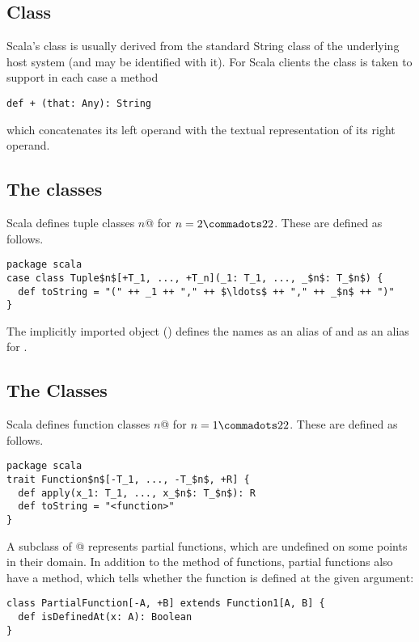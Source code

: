 \subsection{Class \large{}}

Scala's \lstinline@String@ class is usually derived from the standard String
class of the underlying host system (and may be identified with
it). For Scala clients the class is taken to support in each case a
method
\begin{lstlisting}
def + (that: Any): String 
\end{lstlisting}
which concatenates its left operand with the textual representation of its
right operand.

\subsection{The \large{} classes}

Scala defines tuple classes \lstinline@Tuple$n$@ for $n = 2 \commadots 22$.
These are defined as follows.

\begin{lstlisting}
package scala 
case class Tuple$n$[+T_1, ..., +T_n](_1: T_1, ..., _$n$: T_$n$) {
  def toString = "(" ++ _1 ++ "," ++ $\ldots$ ++ "," ++ _$n$ ++ ")"
}
\end{lstlisting}

The implicitly imported  object () defines
the names  as an alias of  and 
as an alias for .

\subsection{The \large{} Classes}
\label{sec:cls-function}

Scala defines function classes \lstinline@Function$n$@ for $n = 1 \commadots 22$.
These are defined as follows.

\begin{lstlisting}
package scala 
trait Function$n$[-T_1, ..., -T_$n$, +R] {
  def apply(x_1: T_1, ..., x_$n$: T_$n$): R
  def toString = "<function>" 
}
\end{lstlisting}

A subclass of @ represents partial functions,
which are undefined on some points in their domain. In addition to the
 method of functions, partial functions also have a
 method, which tells whether the function is defined
at the given argument:
\begin{lstlisting}
class PartialFunction[-A, +B] extends Function1[A, B] {
  def isDefinedAt(x: A): Boolean
}
\end{lstlisting}

